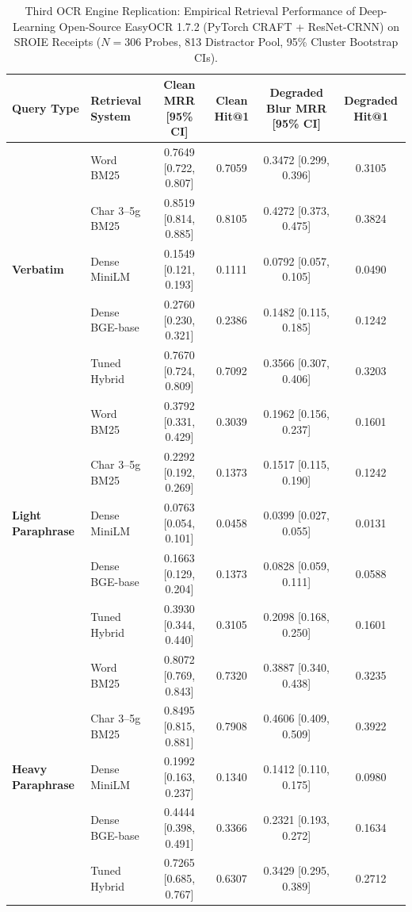 \begin{table}[t]
\centering
\small
\caption{Third OCR Engine Replication: Empirical Retrieval Performance of Deep-Learning Open-Source EasyOCR 1.7.2 (PyTorch CRAFT + ResNet-CRNN) on SROIE Receipts ($N=306$ Probes, 813 Distractor Pool, 95\% Cluster Bootstrap CIs).}
\label{tab:easyocr_replication_v9}
\begin{tabular}{llcccc}
\toprule
Query Type & Retrieval System & Clean MRR [95\% CI] & Clean Hit@1 & Degraded Blur MRR [95\% CI] & Degraded Hit@1 \\
\midrule
\multirow{5}{*}{\textbf{Verbatim}}
 & Word BM25             & 0.7649 [0.722, 0.807] & 0.7059 & 0.3472 [0.299, 0.396] & 0.3105 \\
 & Char 3--5g BM25       & 0.8519 [0.814, 0.885] & 0.8105 & 0.4272 [0.373, 0.475] & 0.3824 \\
 & Dense MiniLM          & 0.1549 [0.121, 0.193] & 0.1111 & 0.0792 [0.057, 0.105] & 0.0490 \\
 & Dense BGE-base        & 0.2760 [0.230, 0.321] & 0.2386 & 0.1482 [0.115, 0.185] & 0.1242 \\
 & Tuned Hybrid          & 0.7670 [0.724, 0.809] & 0.7092 & 0.3566 [0.307, 0.406] & 0.3203 \\
\midrule
\multirow{5}{*}{\textbf{Light Paraphrase}}
 & Word BM25             & 0.3792 [0.331, 0.429] & 0.3039 & 0.1962 [0.156, 0.237] & 0.1601 \\
 & Char 3--5g BM25       & 0.2292 [0.192, 0.269] & 0.1373 & 0.1517 [0.115, 0.190] & 0.1242 \\
 & Dense MiniLM          & 0.0763 [0.054, 0.101] & 0.0458 & 0.0399 [0.027, 0.055] & 0.0131 \\
 & Dense BGE-base        & 0.1663 [0.129, 0.204] & 0.1373 & 0.0828 [0.059, 0.111] & 0.0588 \\
 & Tuned Hybrid          & 0.3930 [0.344, 0.440] & 0.3105 & 0.2098 [0.168, 0.250] & 0.1601 \\
\midrule
\multirow{5}{*}{\textbf{Heavy Paraphrase}}
 & Word BM25             & 0.8072 [0.769, 0.843] & 0.7320 & 0.3887 [0.340, 0.438] & 0.3235 \\
 & Char 3--5g BM25       & 0.8495 [0.815, 0.881] & 0.7908 & 0.4606 [0.409, 0.509] & 0.3922 \\
 & Dense MiniLM          & 0.1992 [0.163, 0.237] & 0.1340 & 0.1412 [0.110, 0.175] & 0.0980 \\
 & Dense BGE-base        & 0.4444 [0.398, 0.491] & 0.3366 & 0.2321 [0.193, 0.272] & 0.1634 \\
 & Tuned Hybrid          & 0.7265 [0.685, 0.767] & 0.6307 & 0.3429 [0.295, 0.389] & 0.2712 \\
\bottomrule
\end{tabular}
\end{table}
